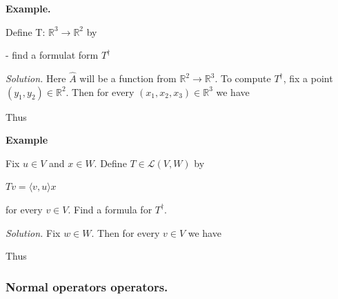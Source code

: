 \documentclass{article}
\begin{document}
\skl

\textbf{Example.}

Define T: $\mathbb{R}^3 \rightarrow \mathbb{R}^2$ by


- find a formulat form $T^\dag$

\textit{Solution.} Here $\hat{A}$ will be a function from $\mathbb{R}^2 \rightarrow \mathbb{R}^3$. To compute $T^\dag$, fix a point $(y_1, y_2) \in \mathbb{R}^2$. Then for every  $(x_1, x_2, x_3) \in \mathbb{R}^3$ we have


Thus



\textbf{Example}

Fix $u \in V$ and $x \in W$. Define $T \in \mathcal{L}(V,W)$ by

$Tv = \langle v, u \rangle x $

for every $v \in V$. Find a formula for $T^\dag$.

\textit{Solution.} Fix $w \in W$. Then for every $v \in V$ we have


Thus







\subsubsection{Normal operators operators.}
\end{document}
